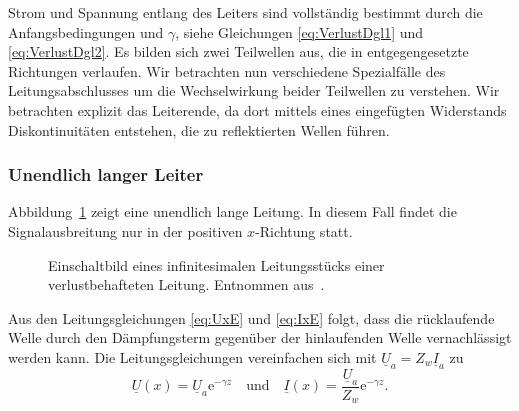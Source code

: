 \documentclass[paper=a4, parskip=half-, ngerman, fontsize=11pt]{scrreprt}
\begin{document}
Strom und Spannung entlang des Leiters sind vollständig bestimmt durch die Anfangsbedingungen und $\gamma$, siehe
Gleichungen \eqref{eq:VerlustDgl1} und \eqref{eq:VerlustDgl2}. Es bilden sich zwei Teilwellen aus, die in
entgegengesetzte Richtungen verlaufen. Wir betrachten nun verschiedene Spezialfälle des Leitungsabschlusses um die
Wechselwirkung beider Teilwellen zu verstehen. Wir betrachten explizit das Leiterende, da dort mittels eines
eingefügten Widerstands Diskontinuitäten entstehen, die zu reflektierten Wellen führen.

\subsubsection{Unendlich langer Leiter}

Abbildung~\ref{OhneAbschluss} zeigt eine unendlich lange Leitung. In diesem Fall findet die Signalausbreitung nur in
der positiven $x$-Richtung statt.
\begin{figure}[!htpb]
    \begin{center}
        
        \caption{Einschaltbild eines infinitesimalen Leitungsstücks einer verlustbehafteten Leitung. Entnommen
            aus~\cite{LeitungenUndFilter}.}
        \label{OhneAbschluss}
    \end{center}
\end{figure}
Aus den Leitungsgleichungen \eqref{eq:UxE} und \eqref{eq:IxE} folgt, dass die rücklaufende Welle durch den
Dämpfungsterm gegenüber der hinlaufenden Welle vernachlässigt werden kann. Die Leitungsgleichungen vereinfachen sich
mit $\underline{U}_{a} = Z_{w} \underline{I}_{a}$ zu
\[ \underline{U}(x) = \underline{U}_{a} \mathrm{e}^{- \gamma z} \quad \text{und} \quad
 \underline{I}(x) = \frac{\underline{U}_{a}}{Z_{w}} \mathrm{e}^{- \gamma z}. \]
\end{document}
